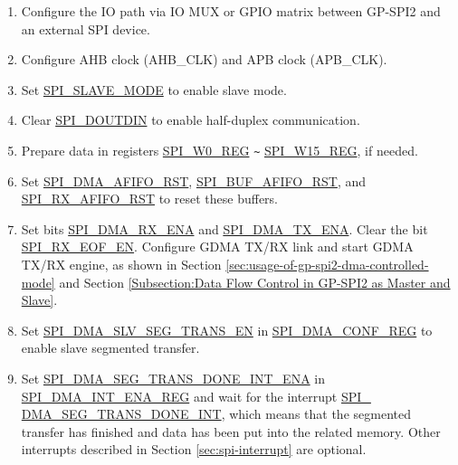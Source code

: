 \documentclass[main\_\_EN.tex]{subfiles}
\begin{document}
\begin{enumerate}
   \item  Configure the IO path via IO MUX or GPIO matrix between GP-SPI2 and an external SPI device. 
   
   \item Configure AHB clock (AHB\_CLK) and APB clock (APB\_CLK).

    \item Set \hyperref[fielddesc:SPISLAVEMODE]{SPI\_SLAVE\_MODE} to enable slave mode. 
    
    \item Clear \hyperref[fielddesc:SPIDOUTDIN]{SPI\_DOUTDIN} to enable half-duplex communication.
    
    \item Prepare data in registers \hyperref[regdesc:SPIW0REG]{SPI\_W0\_REG} \verb+~+ \hyperref[regdesc:SPIW0REG]{SPI\_W15\_REG}, if needed. 
    
    \item Set \hyperref[fielddesc:SPIDMAAFIFORST]{SPI\_DMA\_AFIFO\_RST}, \hyperref[fielddesc:SPIBUFAFIFORST]{SPI\_BUF\_AFIFO\_RST}, and \hyperref[fielddesc:SPIRXAFIFORST]{SPI\_RX\_AFIFO\_RST} to reset these buffers.
        
    \item Set bits \hyperref[fielddesc:SPIDMARXENA]{SPI\_DMA\_RX\_ENA} and \hyperref[fielddesc:SPIDMATXENA]{SPI\_DMA\_TX\_ENA}. Clear the bit \hyperref[fielddesc:SPIRXEOFEN]{SPI\_RX\_EOF\_EN}. Configure GDMA TX/RX link and start GDMA TX/RX engine, as shown in Section \ref{sec:usage-of-gp-spi2-dma-controlled-mode} and Section \ref{Subsection:Data Flow Control in GP-SPI2 as Master and Slave}.

    \item Set \hyperref[fielddesc:SPIDMASLVSEGTRANSEN]{SPI\_DMA\_SLV\_SEG\_TRANS\_EN} in \hyperref[regdesc:SPIDMACONFREG]{SPI\_DMA\_CONF\_REG} to enable slave segmented transfer.
    
    \item Set \hyperref[fielddesc:SPIDMASEGTRANSDONEINTENA]{SPI\_DMA\_SEG\_TRANS\_DONE\_INT\_ENA} in \hyperref[regdesc:SPIDMAINTENAREG]{SPI\_DMA\_INT\_ENA\_REG} and wait for the interrupt \hyperref[int:SPIDMASEGTRANSDONEINT]{SPI\_\\DMA\_SEG\_TRANS\_DONE\_INT}, which means that the segmented transfer has finished and data has been put into the related memory. Other interrupts described in Section \ref{sec:spi-interrupt} are optional.
\end{enumerate}
\end{document}
